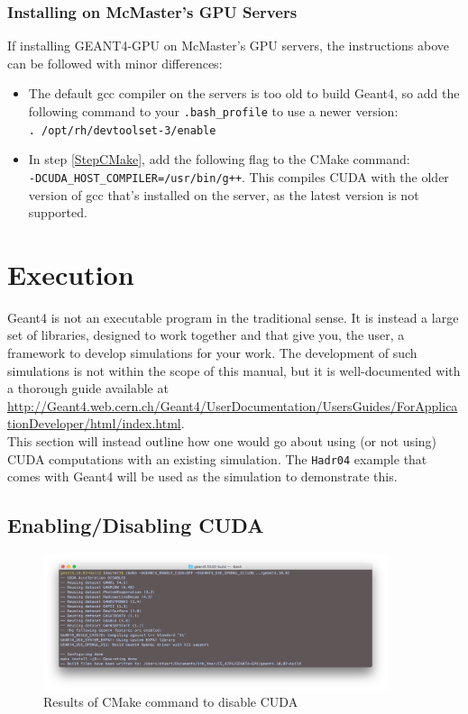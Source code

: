 \documentclass[12pt]{article}
\begin{document}
\subsubsection{Installing on McMaster's GPU Servers}\label{SecMac}
If installing GEANT4-GPU on McMaster's GPU servers, the instructions above can be followed with minor differences:
\begin{itemize}
\item The default gcc compiler on the servers is too old to build Geant4, so add the following command to your \texttt{.bash\_profile} to use a newer version:\\
\texttt{. /opt/rh/devtoolset-3/enable}
\item In step \ref{StepCMake}, add the following flag to the CMake command:\\
\texttt{-DCUDA\_HOST\_COMPILER=/usr/bin/g++}. This compiles CUDA with the older version of gcc that's installed on the server, as the latest version is not supported.
\end{itemize}

\section{Execution} %
Geant4 is not an executable program in the traditional sense. It is instead a large set of libraries, designed to work together and that give you, the user, a framework to develop simulations for your work. The development of such simulations is not within the scope of this manual, but it is well-documented with a thorough guide available at \url{http://Geant4.web.cern.ch/Geant4/UserDocumentation/UsersGuides/ForApplicationDeveloper/html/index.html}.\\

This section will instead outline how one would go about using (or not using) CUDA computations with an existing simulation. The \texttt{Hadr04} example that comes with Geant4 will be used as the simulation to demonstrate this.


\subsection{Enabling/Disabling CUDA} %
\begin{figure}[!hbtp]
\centering
\caption{Results of CMake command to disable CUDA}\label{FigDisable}
\includegraphics[width=0.9\textwidth]{cmakedisable.png}
\end{figure}
\end{document}
